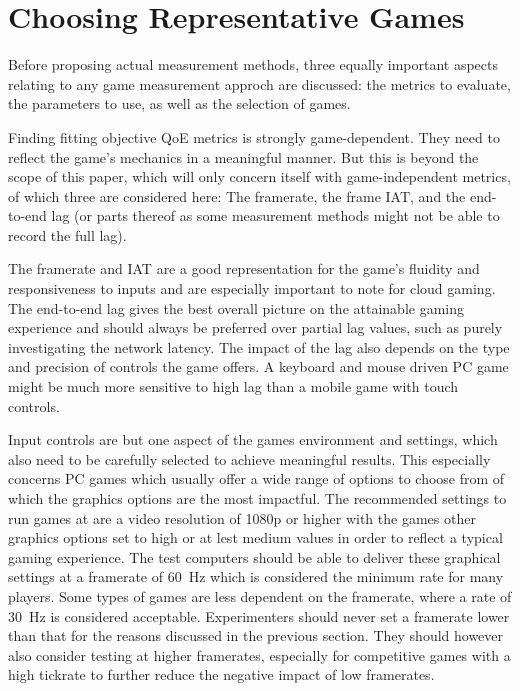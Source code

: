 \section{Choosing Representative Games}
\label{sec:game-criteria}

Before proposing actual measurement methods, three equally important aspects relating to any game measurement approch are discussed: the metrics to evaluate, the parameters to use, as well as the selection of games. 

Finding fitting objective \gls{QoE} metrics is strongly game-dependent. They need to reflect the game's mechanics in a meaningful manner. But this is beyond the scope of this paper, which will only concern itself with game-independent metrics, of which three are considered here: The framerate, the frame \gls{IAT}, and the end-to-end lag (or parts thereof as some measurement methods might not be able to record the full lag).

The framerate and \gls{IAT} are a good representation for the game's fluidity and responsiveness to inputs and are especially important to note for cloud gaming. The end-to-end lag gives the best overall picture on the attainable gaming experience and should always be preferred over partial lag values, such as purely investigating the network latency. The impact of the lag also depends on the type and precision of controls the game offers. A keyboard and mouse driven PC game might be much more sensitive to high lag than a mobile game with touch controls.

Input controls are but one aspect of the games environment and settings, which also need to be carefully selected to achieve meaningful results. This especially concerns PC games which usually offer a wide range of options to choose from of which the graphics options are the most impactful. The recommended settings to run games at are a video resolution of 1080p or higher with the games other graphics options set to high or at lest medium values in order to reflect a typical gaming experience. The test computers should be able to deliver these graphical settings at a framerate of \SI{60}{\hertz} which is considered the minimum rate for many players. Some types of games are less dependent on the framerate, where a rate of \SI{30}{\hertz} is considered acceptable. Experimenters should never set a framerate lower than that for the reasons discussed in the previous section. They should however also consider testing at higher framerates, especially for competitive games with a high tickrate to further reduce the negative impact of low framerates.

